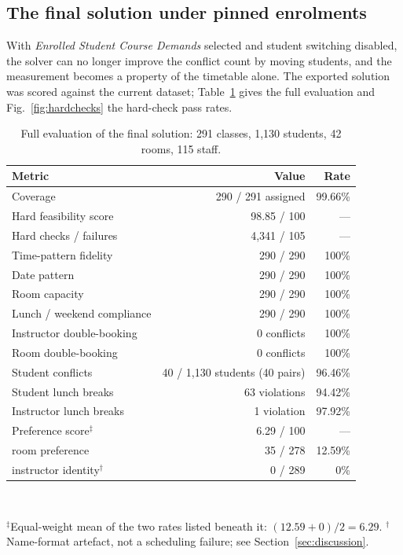 \documentclass[journal]{IEEEtran}
\begin{document}
\subsection{The final solution under pinned enrolments}
\label{sec:final}
With \emph{Enrolled Student Course Demands} selected and student switching disabled, the solver can no longer improve the conflict count by moving students, and the measurement becomes a property of the timetable alone. The exported solution was scored against the current dataset; Table~\ref{tab:final} gives the full evaluation and Fig.~\ref{fig:hardchecks} the hard-check pass rates.

\begin{table}[t]
\centering
\caption{Full evaluation of the final solution: 291 classes, 1{,}130 students, 42 rooms, 115 staff.}
\label{tab:final}
\footnotesize
\begin{tabular}{@{}lrr@{}}
\toprule
Metric & Value & Rate \\
\midrule
Coverage & 290 / 291 assigned & 99.66\% \\
Hard feasibility score & 98.85 / 100 & --- \\
Hard checks / failures & 4{,}341 / 105 & --- \\
Time-pattern fidelity & 290 / 290 & 100\% \\
Date pattern & 290 / 290 & 100\% \\
Room capacity & 290 / 290 & 100\% \\
Lunch / weekend compliance & 290 / 290 & 100\% \\
Instructor double-booking & 0 conflicts & 100\% \\
Room double-booking & 0 conflicts & 100\% \\
Student conflicts & 40 / 1{,}130 students (40 pairs) & 96.46\% \\
Student lunch breaks & 63 violations & 94.42\% \\
Instructor lunch breaks & 1 violation & 97.92\% \\
Preference score$^{\ddagger}$ & 6.29 / 100 & --- \\
\quad room preference & 35 / 278 & 12.59\% \\
\quad instructor identity$^{\dagger}$ & 0 / 289 & 0\% \\
\bottomrule
\end{tabular}
\\[2pt]
\raggedright\footnotesize $^{\ddagger}$Equal-weight mean of the two rates listed beneath it: $(12.59+0)/2=6.29$. $^{\dagger}$Name-format artefact, not a scheduling failure; see Section~\ref{sec:discussion}.
\end{table}
\end{document}
